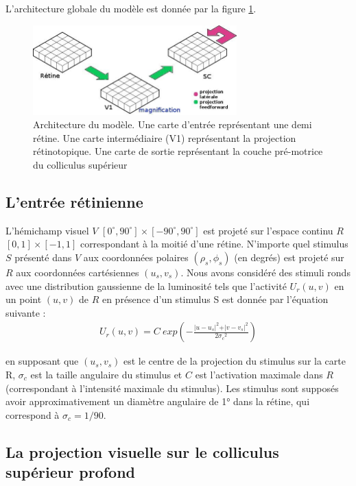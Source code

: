 L'architecture globale du modèle est donnée par la figure \ref{archi}.
\begin{figure}[ht]
  \begin{center}
    \includegraphics[width=0.7\textwidth]{figures/ch3_3_model0}
  \end{center}
  \caption{ Architecture du modèle. Une carte d'entrée représentant une demi rétine. Une carte intermédiaire (V1) représentant la projection rétinotopique. Une carte de sortie représentant la couche pré-motrice du colliculus supérieur }
  \label{archi}
\end{figure}
\subsection{L'entrée rétinienne}

 L'hémichamp visuel $V$ $[0^\circ,90^\circ]\times[-90^\circ,90^\circ]$ est projeté sur l'espace continu $R$ $[0,1]\times[-1,1]$ correspondant à la moitié d'une rétine. N'importe quel stimulus $S$ présenté dans $V$ aux coordonnées polaires $(\rho_s,\phi_s)$ (en degrés) est projeté sur $R$ aux coordonnées cartésiennes $(u_s, v_s)$. Nous avons considéré des stimuli ronds avec une distribution gaussienne de la luminosité tels que l'activité $U_r (u, v)$ en un point $(u, v)$ de $R$ en présence d'un stimulus S est donnée par l'équation suivante :\\

\begin{align}
  U_r(u,v)= C~exp\left(-\frac{\vert u - u_s\vert^2 + \vert v - v_s \vert^2}{2{\sigma_c}^2}\right)
\end{align}

en supposant que $(u_s, v_s)$ est le centre de la projection du stimulus sur la carte R, $\sigma_c$ est la taille angulaire du stimulus et $C$ est l'activation maximale dans $R$ (correspondant à l'intensité maximale du stimulus). Les stimulus sont supposés avoir approximativement un diamètre angulaire de 1° dans la rétine, qui correspond à $\sigma_c=1/90$.\\

\subsection{La projection visuelle sur le colliculus supérieur profond }

